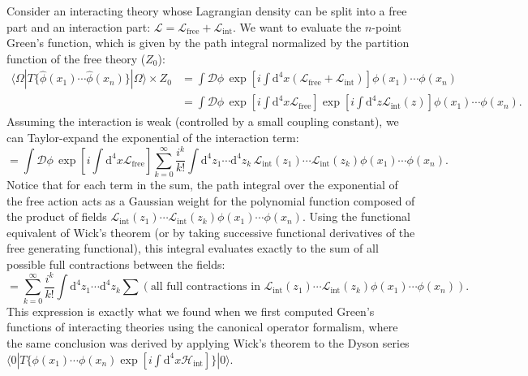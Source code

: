 Consider an interacting theory whose Lagrangian density can be split into a free part and an interaction part: $\mathcal{L} = \mathcal{L}_{\text{free}} + \mathcal{L}_{\text{int}}$.
We want to evaluate the $n$-point Green's function, which is given by the path integral normalized by the partition function of the free theory ($Z_0$):
\[
    \begin{aligned}
        \langle \Omega | T \{ \hat{\phi}(x_1) \cdots \hat{\phi}(x_n) \} | \Omega \rangle \times Z_0 & = \int \mathcal{D}\phi \, \exp\left[ i \int \mathrm{d}^4x (\mathcal{L}_{\text{free}} + \mathcal{L}_{\text{int}}) \right] \phi(x_1) \cdots \phi(x_n)                                         \\
                                                                                                    & = \int \mathcal{D}\phi \, \exp\left[ i \int \mathrm{d}^4x \mathcal{L}_{\text{free}} \right] \exp\left[ i \int \mathrm{d}^4z \mathcal{L}_{\text{int}}(z) \right] \phi(x_1) \cdots \phi(x_n).
    \end{aligned}
\]
Assuming the interaction is weak (controlled by a small coupling constant), we can Taylor-expand the exponential of the interaction term:
\[
    = \int \mathcal{D}\phi \, \exp\left[ i \int \mathrm{d}^4x \mathcal{L}_{\text{free}} \right] \sum_{k=0}^{\infty} \frac{i^k}{k!} \int \mathrm{d}^4z_1 \cdots \mathrm{d}^4z_k \, \mathcal{L}_{\text{int}}(z_1) \cdots \mathcal{L}_{\text{int}}(z_k) \phi(x_1) \cdots \phi(x_n).
\]
Notice that for each term in the sum, the path integral over the exponential of the free action acts as a Gaussian weight for the polynomial function composed of the product of fields $\mathcal{L}_{\text{int}}(z_1) \cdots \mathcal{L}_{\text{int}}(z_k) \phi(x_1) \cdots \phi(x_n)$.
Using the functional equivalent of Wick's theorem (or by taking successive functional derivatives of the free generating functional), this integral evaluates exactly to the sum of all possible full contractions between the fields:
\[
    = \sum_{k=0}^{\infty} \frac{i^k}{k!} \int \mathrm{d}^4z_1 \cdots \mathrm{d}^4z_k \sum \left( \text{all full contractions in } \mathcal{L}_{\text{int}}(z_1) \cdots \mathcal{L}_{\text{int}}(z_k) \phi(x_1) \cdots \phi(x_n) \right).
\]
This expression is exactly what we found when we first computed Green's functions of interacting theories using the canonical operator formalism, where the same conclusion was derived by applying Wick's theorem to the Dyson series $\langle 0 | T \{ \phi(x_1) \cdots \phi(x_n) \exp[i \int \mathrm{d}^4x \mathcal{H}_{\text{int}}] \} | 0 \rangle$.


